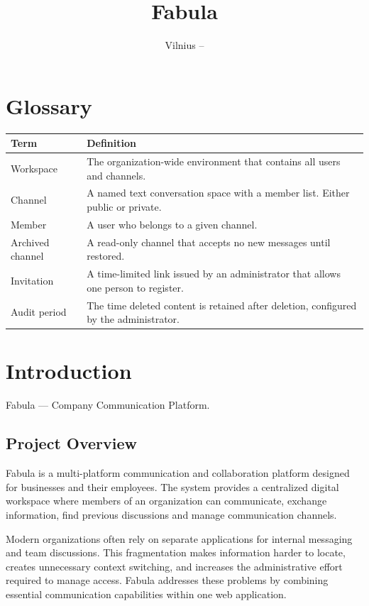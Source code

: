 \documentclass[
    english, %
]{VUMIFPSkursinis}
\title{Fabula}
\author{\shortstack[l]{
Aistė Aškinytė\\[0.4em]
Petras Maciulevičius\\[0.4em]
Artūras Ramoškevičius\\[0.4em]
Ugnius Vaičeskas\\[0.4em]
Haroldas Trinkūnas
}}
\date{Vilnius – \the\year}
\begin{document}
\maketitle

\tableofcontents
\clearpage

\section*{Glossary}
\begin{table}[H]
\centering
\small
\renewcommand{\arraystretch}{1.3}
\begin{tabular}{|p{}|p{}|}
\hline
\textbf{Term} & \textbf{Definition} \\ \hline
Workspace & The organization-wide environment that contains all users and channels. \\ \hline
Channel & A named text conversation space with a member list. Either public or private. \\ \hline
Member & A user who belongs to a given channel. \\ \hline
Archived channel & A read-only channel that accepts no new messages until restored. \\ \hline
Invitation & A time-limited link issued by an administrator that allows one person to register. \\ \hline
Audit period & The time deleted content is retained after deletion, configured by the administrator. \\ \hline
\end{tabular}
\end{table}

\section{Introduction}

Fabula --- Company Communication Platform.

\subsection{Project Overview}
Fabula is a multi-platform communication and collaboration platform designed for businesses and their employees. The system provides a centralized digital workspace where members of an organization can communicate, exchange information, find previous discussions and manage communication channels. 

Modern organizations often rely on separate applications for internal messaging and team discussions. This fragmentation makes information harder to locate, creates unnecessary context switching, and increases the administrative effort required to manage access. Fabula addresses these problems by combining essential communication capabilities within one web application.
\end{document}
